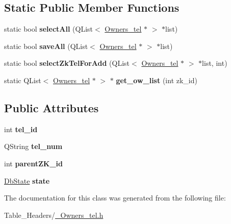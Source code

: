 \subsection*{Static Public Member Functions}
\begin{DoxyCompactItemize}
\item 
\mbox{\label{class_owners__tel_a0441f14b07a15da8da30f0ce48bb9adf}} 
static bool {\bfseries select\+All} (Q\+List$<$ \mbox{\hyperlink{class_owners__tel}{Owners\+\_\+tel}} $\ast$ $>$ $\ast$list)
\item 
\mbox{\label{class_owners__tel_a5e68d42830a594ab13da6436d15ab0f5}} 
static bool {\bfseries save\+All} (Q\+List$<$ \mbox{\hyperlink{class_owners__tel}{Owners\+\_\+tel}} $\ast$ $>$ $\ast$list)
\item 
\mbox{\label{class_owners__tel_aa5e308f0b18510b4f28ae812eec2284f}} 
static bool {\bfseries select\+Zk\+Tel\+For\+Add} (Q\+List$<$ \mbox{\hyperlink{class_owners__tel}{Owners\+\_\+tel}} $\ast$ $>$ $\ast$list, int)
\item 
\mbox{\label{class_owners__tel_a92738db70ad6a994e37a1e713095c670}} 
static Q\+List$<$ \mbox{\hyperlink{class_owners__tel}{Owners\+\_\+tel}} $\ast$ $>$ $\ast$ {\bfseries get\+\_\+ow\+\_\+list} (int zk\+\_\+id)
\end{DoxyCompactItemize}
\subsection*{Public Attributes}
\begin{DoxyCompactItemize}
\item 
\mbox{\label{class_owners__tel_a0ca560fd8411b3f9962bc9bf467ba438}} 
int {\bfseries tel\+\_\+id}
\item 
\mbox{\label{class_owners__tel_a6a2e4c4464f9611090339ecdb6a6e35a}} 
Q\+String {\bfseries tel\+\_\+num}
\item 
\mbox{\label{class_owners__tel_a9f666b55866eba4e522a7c129104a7c5}} 
int {\bfseries parent\+Z\+K\+\_\+id}
\item 
\mbox{\label{class_owners__tel_a2eb9b1c6a29c9f5f97fc077cb75643c1}} 
\mbox{\hyperlink{___contacts_8h_ad709f09dcd44386da4fec847f603fa4c}{Db\+State}} {\bfseries state}
\end{DoxyCompactItemize}


The documentation for this class was generated from the following file\+:\begin{DoxyCompactItemize}
\item 
Table\+\_\+\+Headers/\mbox{\hyperlink{___owners__tel_8h}{\+\_\+\+Owners\+\_\+tel.\+h}}\end{DoxyCompactItemize}
